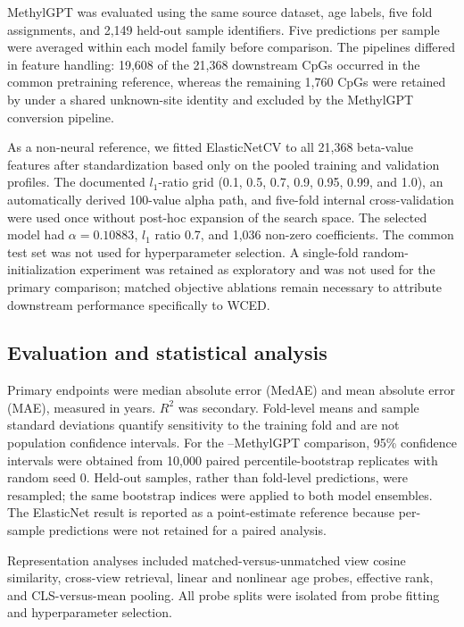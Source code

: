MethylGPT \citep{Ying2024} was evaluated using the same source dataset, age labels, five fold
assignments, and 2,149 held-out sample identifiers. Five predictions per sample were averaged
within each model family before comparison. The pipelines differed in feature handling:
19,608 of the 21,368 downstream CpGs occurred in the common pretraining reference, whereas
the remaining 1,760 CpGs were retained by \method{} under a shared unknown-site identity and
excluded by the MethylGPT conversion pipeline.

As a non-neural reference, we fitted ElasticNetCV \citep{Zou2005} to all 21,368 beta-value
features after standardization based only on the pooled training and validation profiles.
The documented $l_1$-ratio grid (0.1, 0.5, 0.7, 0.9, 0.95, 0.99, and 1.0), an automatically
derived 100-value alpha path, and five-fold internal cross-validation were used once without
post-hoc expansion of the search space. The selected model had $\alpha=0.10883$,
$l_1$ ratio 0.7, and 1,036 non-zero coefficients. The common test set was not used for
hyperparameter selection. A single-fold random-initialization experiment was retained as
exploratory and was not used for the primary comparison; matched objective ablations remain
necessary to attribute downstream performance specifically to WCED.

\subsection{Evaluation and statistical analysis}

Primary endpoints were median absolute error (MedAE) and mean absolute error (MAE), measured
in years. $R^2$ was secondary. Fold-level means and sample standard deviations quantify
sensitivity to the training fold and are not population confidence intervals. For the
\method{}--MethylGPT comparison, 95\% confidence intervals were obtained from 10,000 paired
percentile-bootstrap replicates with random seed 0. Held-out samples, rather than fold-level
predictions, were resampled; the same bootstrap indices were applied to both model ensembles.
The ElasticNet result is reported as a point-estimate reference because per-sample predictions
were not retained for a paired analysis.

Representation analyses included matched-versus-unmatched view cosine similarity, cross-view
retrieval, linear and nonlinear age probes, effective rank, and CLS-versus-mean pooling.
All probe splits were isolated from probe fitting and hyperparameter selection.


